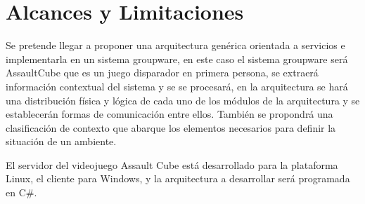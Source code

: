 \section{Alcances y Limitaciones}
Se pretende llegar a proponer una arquitectura gen\'erica orientada a servicios e implementarla en un sistema groupware, en este caso el sistema groupware ser\'a AssaultCube que es un juego disparador en primera persona, se extraer\'a informaci\'on contextual del sistema y se se procesar\'a, en la arquitectura se har\'a una distribuci\'on f\'isica y l\'ogica de cada uno de los m\'odulos de la arquitectura y se establecer\'an formas de comunicaci\'on entre ellos. Tambi\'en se propondr\'a una clasificaci\'on de contexto que abarque los elementos necesarios para definir la situaci\'on de un ambiente.

El servidor del videojuego Assault Cube est\'a desarrollado para la plataforma Linux, el cliente para Windows, y la arquitectura a desarrollar ser\'a programada en C\#.
